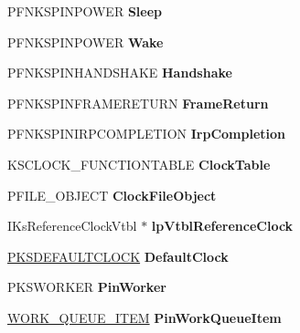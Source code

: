 \begin{DoxyCompactItemize}
P\+F\+N\+K\+S\+P\+I\+N\+P\+O\+W\+ER {\bfseries Sleep}
\item 
\mbox{\label{struct_i_ks_pin_impl_a08d5dfa3b2fafe32c56e40758b2cf902}} 
P\+F\+N\+K\+S\+P\+I\+N\+P\+O\+W\+ER {\bfseries Wake}
\item 
\mbox{\label{struct_i_ks_pin_impl_a2d1a7e82bfeb251d3fde7357a683aa6c}} 
P\+F\+N\+K\+S\+P\+I\+N\+H\+A\+N\+D\+S\+H\+A\+KE {\bfseries Handshake}
\item 
\mbox{\label{struct_i_ks_pin_impl_a136100bc5e86e62e97fd172eeac59615}} 
P\+F\+N\+K\+S\+P\+I\+N\+F\+R\+A\+M\+E\+R\+E\+T\+U\+RN {\bfseries Frame\+Return}
\item 
\mbox{\label{struct_i_ks_pin_impl_ac74b00b07d1a41544d6eeb2ec3a0d107}} 
P\+F\+N\+K\+S\+P\+I\+N\+I\+R\+P\+C\+O\+M\+P\+L\+E\+T\+I\+ON {\bfseries Irp\+Completion}
\item 
\mbox{\label{struct_i_ks_pin_impl_a33b6eacdbc8562f06618d79d3b0facec}} 
K\+S\+C\+L\+O\+C\+K\+\_\+\+F\+U\+N\+C\+T\+I\+O\+N\+T\+A\+B\+LE {\bfseries Clock\+Table}
\item 
\mbox{\label{struct_i_ks_pin_impl_af3126996bf41ce4168ccac73d557a601}} 
P\+F\+I\+L\+E\+\_\+\+O\+B\+J\+E\+CT {\bfseries Clock\+File\+Object}
\item 
\mbox{\label{struct_i_ks_pin_impl_ae4e22e59af606093ba25b3cc1da63098}} 
I\+Ks\+Reference\+Clock\+Vtbl $\ast$ {\bfseries lp\+Vtbl\+Reference\+Clock}
\item 
\mbox{\label{struct_i_ks_pin_impl_a1803294154b0b178991b8ecebcf16861}} 
\hyperlink{interfacevoid}{P\+K\+S\+D\+E\+F\+A\+U\+L\+T\+C\+L\+O\+CK} {\bfseries Default\+Clock}
\item 
\mbox{\label{struct_i_ks_pin_impl_acfd760cef88f6640bf02c18a586379d7}} 
P\+K\+S\+W\+O\+R\+K\+ER {\bfseries Pin\+Worker}
\item 
\mbox{\label{struct_i_ks_pin_impl_a99605a357f1403f37b70f966a6e71cc5}} 
\hyperlink{struct___w_o_r_k___q_u_e_u_e___i_t_e_m}{W\+O\+R\+K\+\_\+\+Q\+U\+E\+U\+E\+\_\+\+I\+T\+EM} {\bfseries Pin\+Work\+Queue\+Item}

\end{DoxyCompactItemize}
